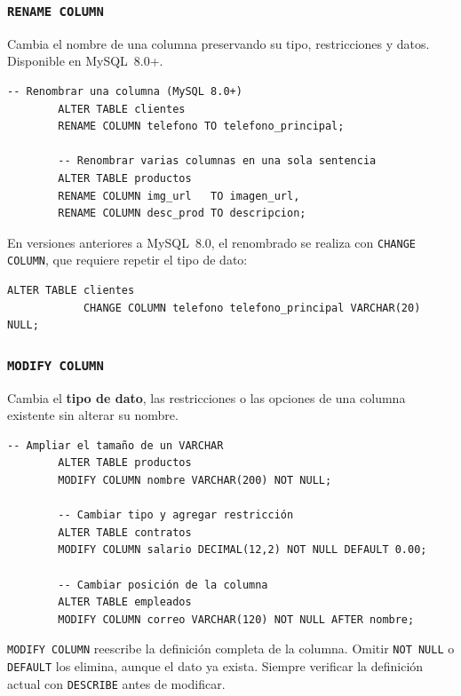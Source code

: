 \documentclass[12pt, a4paper]{article}
\begin{document}
	\subsubsection{\texttt{RENAME COLUMN}}
	
	Cambia el nombre de una columna preservando su tipo, restricciones y datos.
	Disponible en MySQL~8.0+.
	
	\begin{lstlisting}[style=sql, caption={RENAME COLUMN}]
		-- Renombrar una columna (MySQL 8.0+)
		ALTER TABLE clientes
		RENAME COLUMN telefono TO telefono_principal;
		
		-- Renombrar varias columnas en una sola sentencia
		ALTER TABLE productos
		RENAME COLUMN img_url   TO imagen_url,
		RENAME COLUMN desc_prod TO descripcion;
	\end{lstlisting}
	
	\begin{nota}
		En versiones anteriores a MySQL~8.0, el renombrado se realiza con
		\texttt{CHANGE COLUMN}, que requiere repetir el tipo de dato:
		\begin{lstlisting}[style=sql, caption={CHANGE COLUMN para MySQL anterior a 8.0}]
			ALTER TABLE clientes
			CHANGE COLUMN telefono telefono_principal VARCHAR(20) NULL;
		\end{lstlisting}
	\end{nota}
	
	\subsubsection{\texttt{MODIFY COLUMN}}
	
	Cambia el \textbf{tipo de dato}, las restricciones o las opciones de una
	columna existente sin alterar su nombre.
	
	\begin{lstlisting}[style=sql, caption={MODIFY COLUMN — cambios de tipo y propiedades}]
		-- Ampliar el tamaño de un VARCHAR
		ALTER TABLE productos
		MODIFY COLUMN nombre VARCHAR(200) NOT NULL;
		
		-- Cambiar tipo y agregar restricción
		ALTER TABLE contratos
		MODIFY COLUMN salario DECIMAL(12,2) NOT NULL DEFAULT 0.00;
		
		-- Cambiar posición de la columna
		ALTER TABLE empleados
		MODIFY COLUMN correo VARCHAR(120) NOT NULL AFTER nombre;
	\end{lstlisting}
	
	\begin{nota}
		\texttt{MODIFY COLUMN} reescribe la definición completa de la columna.
		Omitir \texttt{NOT NULL} o \texttt{DEFAULT} los elimina, aunque el dato
		ya exista. Siempre verificar la definición actual con \texttt{DESCRIBE}
		antes de modificar.
	\end{nota}
	
\end{document}
